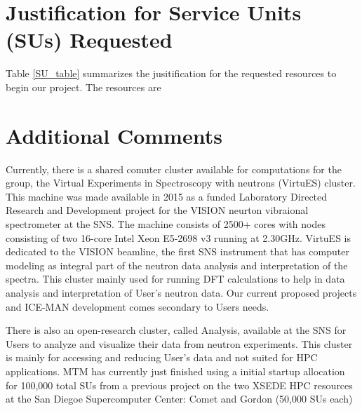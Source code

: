 \documentclass{proposalnsf}
\begin{document}
\section*{Justification for Service Units (SUs) Requested}

Table \ref{SU_table} summarizes the jusitification for the requested resources to begin our project. The resources are 

\begin{table}[H]
  \caption{Summary of requested service units for projects}\label{SU_table}
\end{table}


\section*{Additional Comments}
Currently, there is a shared comuter cluster available for computations for the group, the Virtual Experiments  in Spectroscopy  with neutrons (VirtuES) cluster. This machine was made available in 2015 as a funded Laboratory Directed Research and Development project for the VISION neurton vibraional spectrometer at the SNS. The machine consists of 2500+ cores with nodes consisting of two 16-core Intel Xeon E5-2698 v3 running at 2.30GHz. VirtuES is dedicated to the VISION beamline, the first SNS instrument that has computer modeling as integral part of the neutron data analysis and interpretation of the spectra. This cluster mainly used for running DFT calculations to help in data analysis and interpretation of User's neutron data. Our current proposed projects and ICE-MAN development comes secondary to Users needs.

There is also an open-research cluster, called Analysis, available at the SNS for Users to analyze and visualize their data from neutron experiments. This cluster is mainly for accessing and reducing User's data and not suited for HPC applications. MTM has currently just finished using a initial startup allocation for 100,000 total SUs from a previous project on the two XSEDE HPC resources at the San Diegoe Supercomputer Center: Comet and Gordon (50,000 SUs each)




\end{document}
